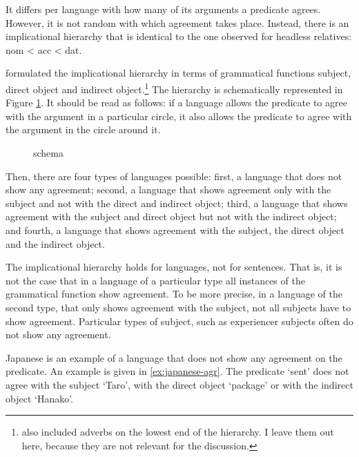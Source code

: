 It differs per language with how many of its arguments a predicate agrees. However, it is not random with which agreement takes place. Instead, there is an implicational hierarchy that is identical to the one observed for headless relatives: \ac{nom} < \ac{acc} < \ac{dat}.

\citet{moravcsik1978} formulated the implicational hierarchy in terms of grammatical functions subject, direct object and indirect object.\footnote{
\citet{moravcsik1978} also included adverbs on the lowest end of the hierarchy. I leave them out here, because they are not relevant for the discussion.
}
The hierarchy is schematically represented in Figure \ref{fig:agr-sub-do-io}. It should be read as follows: if a language allows the predicate to agree with the argument in a particular circle, it also allows the predicate to agree with the argument in the circle around it.

\begin{figure}[ht]
  \centering
  \caption{ schema}
  \label{fig:agr-sub-do-io}
\end{figure}

Then, there are four types of languages possible: first, a language that does not show any agreement; second, a language that shows agreement only with the subject and not with the direct and indirect object; third, a language that shows agreement with the subject and direct object but not with the indirect object; and fourth, a language that shows agreement with the subject, the direct object and the indirect object.

The implicational hierarchy holds for languages, not for sentences. That is, it is not the case that in a language of a particular type all instances of the grammatical function show agreement. To be more precise, in a language of the second type, that only shows agreement with the subject, not all subjects have to show agreement. Particular types of subject, such as experiencer subjects often do not show any agreement.

Japanese is an example of a language that does not show any agreement on the predicate. An example is given in \ref{ex:japanese-agr}. The predicate  `sent' does not agree with the subject  `Taro', with the direct object  `package' or with the indirect object  `Hanako'.

